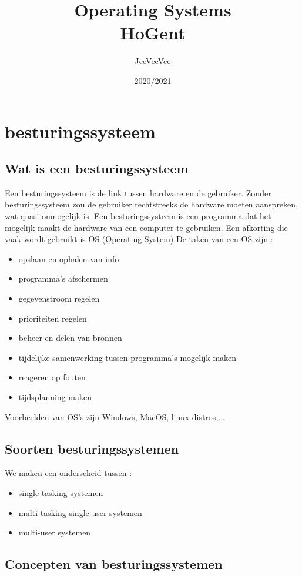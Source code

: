 \documentclass{report}
\title{Operating Systems\\ HoGent}
\author{JeeVeeVee}
\date{2020/2021}
\begin{document}
	\maketitle
   	\tableofcontents
   	\chapter{besturingssysteem}
	   	\section{Wat is een besturingssysteem}
		   	Een besturingssysteem is de link tussen hardware en de gebruiker.  Zonder besturingssysteem zou de gebruiker rechtstreeks de hardware moeten aanspreken, wat quasi onmogelijk is. 
		  	Een besturingssysteem is een programma dat het mogelijk maakt de hardware van een computer te gebruiken. Een afkorting die vaak wordt gebruikt is OS (Operating System)
		   	De taken van een OS zijn : 
		   	\begin{itemize}
		   		\item opslaan en ophalen van info 
		   		\item programma's afschermen 
		   		\item gegevenstroom regelen 
		   		\item prioriteiten regelen
		   		\item beheer en delen van bronnen 
		   		\item tijdelijke samenwerking tussen programma's mogelijk maken 
		   		\item reageren op fouten 
		   		\item tijdsplanning maken 
	  		\end{itemize}
	  	 	Voorbeelden van OS's zijn Windows, MacOS, linux distros,...
	  	 \section{Soorten besturingssystemen}
	  	 	We maken een onderscheid tussen : 
	  	 	\begin{itemize}
	  	 		\item single-tasking systemen 
	  	 		\item multi-tasking single user systemen 
	  	 		\item multi-user systemen 
	  	 	\end{itemize}	  	 	
  	 	\section{Concepten van besturingssystemen}
\end{document}
